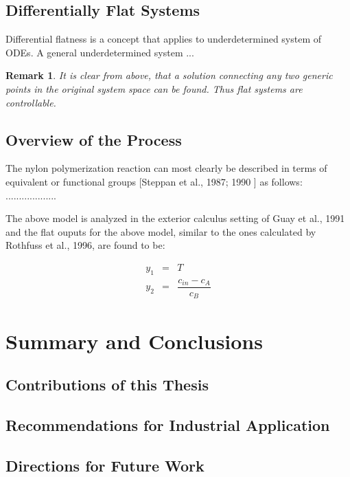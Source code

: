 \documentclass[11pt]{report}
\newtheorem{remark}[theorem]{Remark}
\begin{document}
\section{Differentially Flat Systems}

Differential flatness is a concept that applies to underdetermined system of
ODEs. A general underdetermined system ...

\begin{remark}
It is clear from above, that a solution connecting any two generic points in
the original system space can be found. Thus flat systems are controllable.
\end{remark}

\section{Overview of the Process}

The nylon polymerization reaction can most clearly be described in terms of
equivalent or functional groups [Steppan et al., 1987; 1990\nocite{steppan1} 
\nocite{steppan2}] as follows: ...................

The above model is analyzed in the exterior calculus setting of Guay et al.,
1991 and the flat ouputs for the above model, similar to the ones calculated
by Rothfuss et al., 1996, are found to be:

\begin{eqnarray*}
y_{1} &=&T \\
y_{2} &=&\dfrac{c_{in}-c_{A}}{c_{B}}
\end{eqnarray*}

\chapter{Summary and Conclusions}

\section{Contributions of this Thesis}

\section{Recommendations for Industrial Application}

\section{Directions for Future Work}
\end{document}
